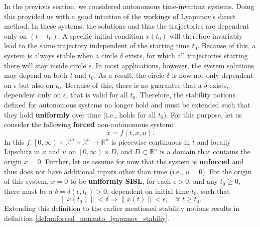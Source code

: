 In the previous section, we considered autonomous time-invariant systems. Doing this provided us with a good intuition of the workings of Lyapunov's direct method. In these systems, the solutions and thus the trajectories are dependent only on $\left(t - t _ 0\right)$. A specific initial condition $x\left(t_0\right)$ will therefore invariably lead to the same trajectory independent of the starting time $t_0$. Because of this, a system is always stable when a circle $\delta$ exists, for which all trajectories starting there will stay inside circle $\epsilon$. In most applications, however, the system solutions may depend on both $t$ and $t_0$. As a result, the circle $\delta$ is now not only dependent on $\epsilon$ but also on $t_0$. Because of this, there is no guarantee that a $\delta$ exists, dependent only on $\epsilon$, that is valid for all $t_0$. Therefore, the stability notions defined for autonomous systems no longer hold and must be extended such that they hold \textbf{uniformly} over time (i.e., holds for all $t_0$). For this purpose, let us consider the following \textbf{forced} non-autonomous system:
\begin{equation} \label{eq:unforced_nonlinear_system}
  \dot{ x }= f \left(t, x, u \right).
\end{equation}
In this $f : \left[0, \infty\right) \times \mathbb{R}^m \times \mathbb{R}^n \rightarrow \mathbb{R}^n$ is piecewise continuous in $t$ and locally Lipschitz in $x$ and $u$ on $\left[0 ,\infty\right)\times D$, and $D \subset \mathbb{R}^n$ is a domain that contains the origin $x = 0$. Further, let us assume for now that the system is \textbf{unforced} and thus does not have additional inputs other than time (i.e., $u=0$). For the origin of this system, $x=0$ to be \textbf{uniformly SISL}, for each $\epsilon > 0$, and any $t_0 \geq 0$, there must be a $\delta = \delta \left( \epsilon, t _ 0 \right)> 0$, dependent on initial time $t_0$, such that
\begin{equation}
  \left\| x\left(t_0\right)\right\| < \delta \Rightarrow \left\| x \left( t \right)\right\| < \epsilon, \quad \forall \; t\geq t_0.
\end{equation}
Extending this definition to the earlier mentioned stability notions results in definition \ref{def:unforced_nonauto_lyapunov_stabiliy}.
